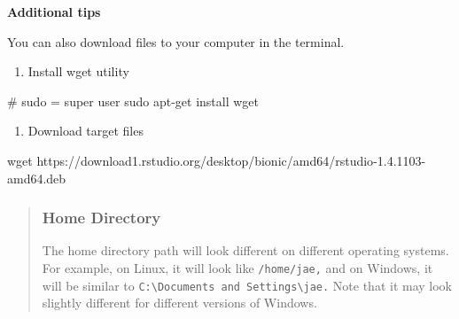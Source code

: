\documentclass[
  letterpaper,
  DIV=11,
  numbers=noendperiod]{scrreprt}
\newenvironment{Shaded}{\begin{snugshade}}{\end{snugshade}}
\newcommand{\CommentTok}[1]{\textcolor[rgb]{0.37,0.37,0.37}{#1}}
\newcommand{\FunctionTok}[1]{\textcolor[rgb]{0.28,0.35,0.67}{#1}}
\newcommand{\NormalTok}[1]{\textcolor[rgb]{0.00,0.23,0.31}{#1}}
\providecommand{\tightlist}{%
  \setlength{\itemsep}{0pt}\setlength{\parskip}{0pt}}\usepackage{longtable,booktabs,array}
\begin{document}
\textbf{Additional tips}

You can also download files to your computer in the terminal.

\begin{enumerate}
\def\labelenumi{\arabic{enumi}.}
\tightlist
\item
  Install wget utility
\end{enumerate}

\begin{Shaded}
\begin{Highlighting}[]
\CommentTok{\# sudo = super user }
\FunctionTok{sudo}\NormalTok{ apt{-}get install wget }
\end{Highlighting}
\end{Shaded}

\begin{enumerate}
\def\labelenumi{\arabic{enumi}.}
\setcounter{enumi}{1}
\tightlist
\item
  Download target files
\end{enumerate}

\begin{Shaded}
\begin{Highlighting}[]
\FunctionTok{wget}\NormalTok{ https://download1.rstudio.org/desktop/bionic/amd64/rstudio{-}1.4.1103{-}amd64.deb}
\end{Highlighting}
\end{Shaded}

\begin{quote}
\hypertarget{home-directory}{%
\subsubsection*{Home Directory}\label{home-directory}}

The home directory path will look different on different operating
systems. For example, on Linux, it will look like \texttt{/home/jae,}
and on Windows, it will be similar to
\texttt{C:\textbackslash{}Documents\ and\ Settings\textbackslash{}jae.}
Note that it may look slightly different for different versions of
Windows.
\end{quote}
\end{document}
